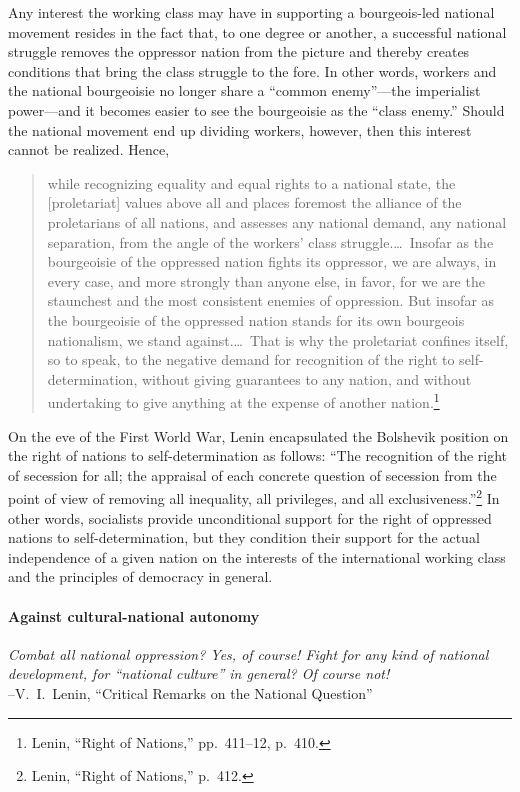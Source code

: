 Any interest the working class may have in supporting a bourgeois-led national movement resides in the fact that, to one degree or another, a successful national struggle removes the oppressor nation from the picture and thereby creates conditions that bring the class struggle to the fore. In other words, workers and the national bourgeoisie no longer share a ``common enemy''---the imperialist power---and it becomes easier to see the bourgeoisie as the ``class enemy.'' Should the national movement end up dividing workers, however, then this interest cannot be realized. Hence,

\blockquote{while recognizing equality and equal rights to a national state, the [proletariat] values above all and places foremost the alliance of the proletarians of all nations, and assesses any national demand, any national separation, from the angle of the workers' class struggle.\ldots\ Insofar as the bourgeoisie of the oppressed nation fights its oppressor, we are always, in every case, and more strongly than anyone else, in favor, for we are the staunchest and the most consistent enemies of oppression. But insofar as the bourgeoisie of the oppressed nation stands for its own bourgeois nationalism, we stand against.\ldots\ That is why the proletariat confines itself, so to speak, to the negative demand for recognition of the right to self-determination, without giving guarantees to any nation, and without undertaking to give anything at the expense of another nation.\footnote{Lenin, ``Right of Nations,'' pp.\ 411--12, p.\ 410.}}

On the eve of the First World War, Lenin encapsulated the Bolshevik position on the right of nations to self-determination as follows: ``The recognition of the right of secession for all; the appraisal of each concrete question of secession from the point of view of removing all inequality, all privileges, and all exclusiveness.''\footnote{Lenin, ``Right of Nations,'' p.\ 412.} In other words, socialists provide unconditional support for the right of oppressed nations to self-determination, but they condition their support for the actual independence of a given nation on the interests of the international working class and the principles of democracy in general.

\paragraph{Against cultural-national autonomy}

\begin{flushleft}\emph{Combat all national oppression? Yes, of course! Fight for any kind of national development, for ``national culture'' in general? Of course not!}\\
--V.\ I.\ Lenin, ``Critical Remarks on the National Question''
\end{flushleft}

